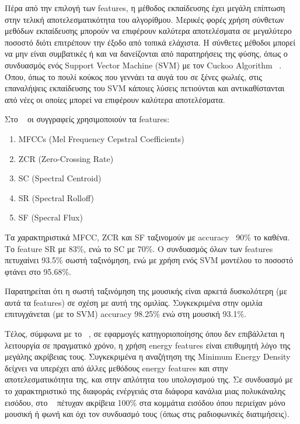 \vspace{1em}
Πέρα από την επιλογή των features, η μέθοδος εκπαίδευσης έχει μεγάλη επίπτωση στην
τελική αποτελεσματικότητα του αλγορίθμου. Μερικές φορές χρήση σύνθετων μεθόδων
εκπαίδευσης μπορούν να επιφέρουν καλύτερα αποτελέσματα σε μεγαλύτερο ποσοστό
διότι επιτρέπουν την έξοδο από τοπικά ελάχιστα. Η σύνθετες μέθοδοι μπορεί να μην
είναι συμβατικές ή και να δανείζονται από παρατηρήσεις της φύσης, όπως ο
συνδυασμός ενός Support Vector Machine (SVM) με τον Cuckoo Algorithm ~\cite{cuckoo}.
Όπου, όπως το πουλί κούκος που γεννάει τα αυγά του σε ξένες φωλιές, στις
επαναλήψεις εκπαίδευσης του SVM κάποιες λύσεις πετιούνται και αντικαθίστανται από
νέες οι οποίες μπορεί να επιφέρουν καλύτερα αποτελέσματα.

\vspace{1em}
Στο ~\cite{hybrid} οι συγγραφείς χρησιμοποιούν τα features:
\begin{enumerate}[noitemsep]
\item ΜFCCs (Mel Frequency Cepstral Coefficients)
\item ZCR (Zero-Crossing Rate)
\item SC (Spectral Centroid)
\item SR (Spectral Rolloff)
\item SF (Specral Flux)
\end{enumerate}

Τα χαρακτηριστικά ΜFCC, ZCR και SF ταξινομούν με accuracy ~90\% το καθένα. Το
feature SR με 83\%, ενώ το SC με 70\%. Ο συνδυασμός όλων των features πετυχαίνει
93.5\% σωστή ταξινόμηση, ενώ με χρήση ενός SVM μοντέλου το ποσοστό φτάνει στο
95.68\%.

Παρατηρείται ότι η σωστή ταξινόμηση της μουσικής είναι αρκετά δυσκολότερη (με
αυτά τα features) σε σχέση με αυτή της ομιλίας. Συγκεκριμένα στην ομιλία
επιτυγχάνεται (με το SVM) accuracy 98.25\% ενώ στη μουσική 93.1\%.

\vspace{1em}
Τέλος, σύμφωνα με το ~\cite{radio}, σε εφαρμογές κατηγοριοποίησης όπου δεν
επιβάλλεται η λειτουργία σε πραγματικό χρόνο, η χρήση energy features είναι
επιθυμητή λόγο της μεγάλης ακρίβειας τους. Συγκεκριμένα η αναζήτηση της Minimum
Energy Density δείχνει να υπερέχει από άλλες μεθόδους energy features και στην
αποτελεσματικότητα της, και στην απλότητα του υπολογισμού της. Σε συνδυασμό με το
χαρακτηριστικό της διαφοράς ενέργειάς στα διάφορα κανάλια μιας πολυκάναλης
εισόδου, στο ~\cite{radio} πέτυχαν ακρίβεια 100\% στα κομμάτια εισόδου όπου
περιείχαν μόνο μουσική ή φωνή και όχι τον συνδυασμό τους (όπως στις ραδιοφωνικές
διατιμήσεις).
